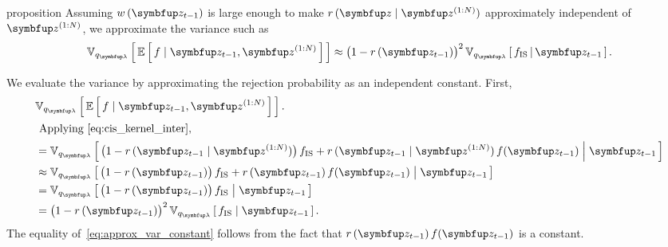 
\begin{theoremEnd}{proposition}\label{thm:approx_var}
  Assuming \(w\,(\vz_{t-1})\) is large enough to make \(r\,(\vz\mid\vz^{(1:N)})\) approximately independent of \(\vz^{(1:N)}\), we approximate the variance such as
  \begin{align}
    \Vsub{q_{\vlambda}}{ \E{ f \mid \vz_{t-1}, \vz^{(1:N)} } } \approx {\big(1 - r\,(\vz_{t-1})\big)}^2\,\Vsub{q_{\vlambda}}{ f_{\text{IS}} \,\middle\vert\, \vz_{t-1} }.
  \end{align}
\end{theoremEnd}
\begin{proofEnd}
  We evaluate the variance by approximating the rejection probability as an independent constant.
  First,
  \begin{align}
    &\Vsub{q_{\vlambda}}{ \E{ f \mid \vz_{t-1}, \vz^{(1:N)} } }. \\
    \intertext{
      Applying~\eqref{eq:cis_kernel_inter},
    }
    &= \Vsub{q_{\vlambda}}{ \big(1 - r\,(\vz_{t-1}\mid\vz^{(1:N)})\big)\, f_{\mathrm{IS}}
      + r\,(\vz_{t-1}\mid\vz^{(1:N)})\,f(\vz_{t-1}) \;\middle\vert\; \vz_{t-1}} \\
    &\approx \Vsub{q_{\vlambda}}{ \big(1 - r\,(\vz_{t-1})\big)\, f_{\mathrm{IS}}
      + r\,(\vz_{t-1})\,f(\vz_{t-1}) \;\middle\vert\; \vz_{t-1}} \\
    &= \Vsub{q_{\vlambda}}{ \big(1 - r\,(\vz_{t-1})\big)\, f_{\mathrm{IS}} \;\middle\vert\; \vz_{t-1} } \label{eq:approx_var_constant} \\
    &= {\big(1 - r\,(\vz_{t-1})\big)}^2 \, \Vsub{q_{\vlambda}}{ f_{\mathrm{IS}} \;\middle\vert\; \vz_{t-1} }. \label{eq:approx_var_linear} 
  \end{align}
  The equality of~\eqref{eq:approx_var_constant} follows from the fact that \(r\,(\vz_{t-1})\,f(\vz_{t-1})\) is a constant.
\end{proofEnd}

